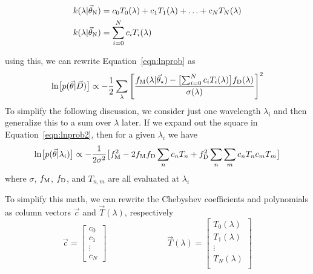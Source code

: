 \documentclass[preprint]{aastex} %
\newcommand{\vt}{\vec{\theta}}
\newcommand{\vstar}{\vt_{\star}}
\newcommand{\vN}{\vt_{\rm N}}
\newcommand{\vc}{\vec{c}}
\newcommand{\fM}{f_{\rm M}}
\newcommand{\fD}{f_{\rm D}}
\newcommand{\vD}{\vec{D}}
\begin{document}
\begin{align}
  k(\lambda | \vN) &= c_0 T_0(\lambda) + c_1 T_1(\lambda) + \ldots + c_N T_N(\lambda) \\
  k(\lambda | \vN) &= \sum^N_{i = 0} c_i T_i(\lambda)
\end{align}

using this, we can rewrite Equation~\ref{eqn:lnprob} as 
\begin{equation}
  \ln \bigl [p(\vt | \vD) \bigr] \propto - \frac{1}{2} \sum_\lambda \left [\frac{\fM(\lambda | \vstar) - \bigl [ \sum^N_{i = 0} c_i T_i(\lambda) \bigr ] \fD(\lambda) }{\sigma(\lambda)} \right ]^2
  \label{eqn:lnprob2}
\end{equation}
To simplify the following discussion, we consider just one wavelength $\lambda_i$ and then generalize this to a sum over $\lambda$ later. If we expand out the square in Equation~\ref{eqn:lnprob2}, then for a given $\lambda_i$ we have
\begin{equation}
 \ln \bigl [p(\vt | \lambda_i) \bigr] \propto -\frac{1}{2 \sigma^2} \bigl [ \fM^2 - 2 \fM \fD \sum_n c_n T_n + \fD^2 \sum_n \sum_m c_n T_n c_m T_m \bigr ]
 \label{eqn:lnprob_lambda}
 \end{equation}
 where $\sigma$, $\fM$, $\fD$, and $T_{n,m}$ are all evaluated at $\lambda_i$

To simplify this math, we can rewrite the Chebyshev coefficients and polynomials as column vectors $\vc$ and $\vec{T}(\lambda)$, respectively
\begin{equation}
  \vc = 
  \begin{bmatrix}
    c_0\\
    c_1\\
    \vdots\\
    c_N
  \end{bmatrix}
  \hspace{3cm}
\vec{T}(\lambda) = 
\begin{bmatrix}
T_0(\lambda)\\
T_1(\lambda)\\
\vdots\\
T_N(\lambda)\\
\end{bmatrix}
\end{equation}
\end{document}

